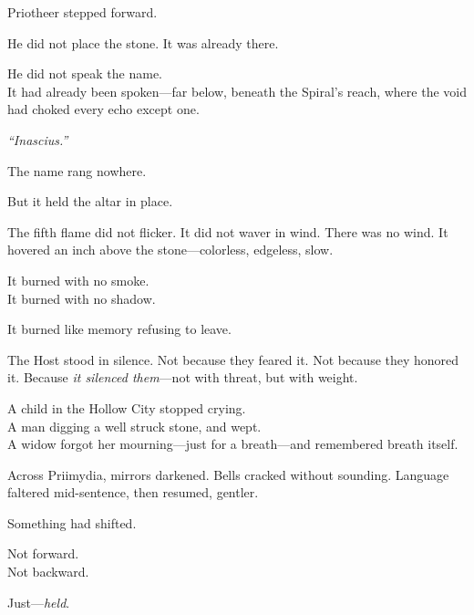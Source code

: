 \documentclass[9pt]{article}
\begin{document}
\vspace{0.5em}
Priotheer stepped forward.

\vspace{0.5em}
He did not place the stone. It was already there.

\vspace{0.5em}
He did not speak the name.\\
It had already been spoken---far below, beneath the Spiral’s reach, where the void had choked every echo except one.

\vspace{0.5em}
\textit{``Inascius.''}

\vspace{0.5em}
The name rang nowhere.

\vspace{0.5em}
But it held the altar in place.

\vspace{0.5em}
The fifth flame did not flicker. It did not waver in wind. There was no wind. It hovered an inch above the stone---colorless, edgeless, slow.

\vspace{0.5em}
It burned with no smoke.\\
It burned with no shadow.

\vspace{0.5em}
It burned like memory refusing to leave.

\vspace{0.5em}
The Host stood in silence. Not because they feared it. Not because they honored it. Because \textit{it silenced them}---not with threat, but with weight.

\vspace{0.5em}
A child in the Hollow City stopped crying.\\
A man digging a well struck stone, and wept.\\
A widow forgot her mourning---just for a breath---and remembered breath itself.

\vspace{0.5em}
Across Priimydia, mirrors darkened. Bells cracked without sounding. Language faltered mid-sentence, then resumed, gentler.

\vspace{0.5em}
Something had shifted.

\vspace{0.5em}
Not forward.\\
Not backward.

\vspace{0.5em}
Just---\textit{held}.
\end{document}
